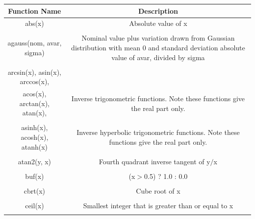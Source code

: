 \begin{longtable}{c c}

\hline\hline %
Function Name & Description \\ [0.5ex] %
\hline %
abs(x) & Absolute value of x \\ \\ %

agauss(nom, avar, sigma) & \begin{minipage}{20em}
  Nominal value plus variation drawn from Gaussian distribution 
	with mean 0 and standard deviation absolute value of avar, divided by sigma
\end{minipage}\\ \\

arcsin(x), asin(x), arccos(x),\\ 
acos(x), arctan(x), atan(x), & \begin{minipage}{20em}
Inverse trigonometric functions. Note these functions give the real part only.
\end{minipage}\\ \\

asinh(x), acosh(x), atanh(x) & \begin{minipage}{20em}
Inverse hyperbolic trigonometric functions. Note these functions give the real part only.
\end{minipage}\\ \\

atan2(y, x) & \begin{minipage}{20em}
Fourth quadrant inverse tangent of y$/$x
\end{minipage}\\ \\

buf(x) & \begin{minipage}{20em}
(x$>$0.5) ? 1.0 : 0.0
\end{minipage}\\ \\

cbrt(x) & \begin{minipage}{20em}
Cube root of x
\end{minipage}\\ \\

ceil(x) & \begin{minipage}{20em}
Smallest integer that is greater than or equal to x
\end{minipage}\\ \\


\end{longtable}
